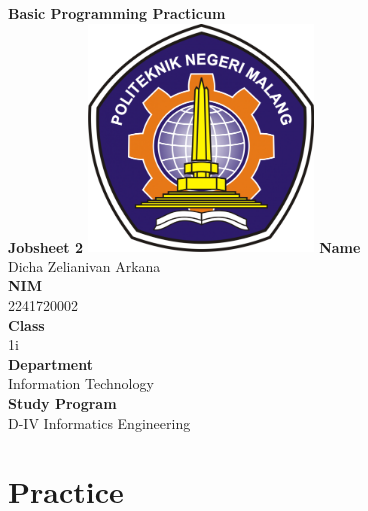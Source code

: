 \documentclass[12pt,titlepage]{article}
\begin{document}
\begin{titlepage}
    \centering
    \vfill
    {\bfseries\LARGE
        Basic Programming Practicum\\
        \vskip0.25cm
        Jobsheet 2
    }
    \vfill
    \includegraphics[width=6cm]{images/polinema-logo.png}
    \vfill
    {\textbf{Name}\\
        Dicha Zelianivan Arkana\\
        \vskip0.5cm
        \textbf{NIM}\\
        2241720002\\
        \vskip0.5cm
        \textbf{Class}\\
        1i\\
        \vskip0.5cm
        \textbf{Department}\\
        Information Technology\\
        \vskip0.5cm
        \textbf{Study Program}\\
        D-IV Informatics Engineering}
\end{titlepage}

\section{Practice}
\end{document}
